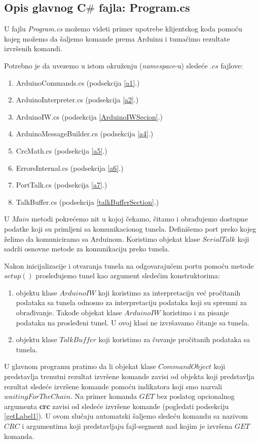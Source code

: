 \documentclass[a4paper]{extarticle}
\begin{document}
	\subsection{Opis glavnog C$\#$ fajla: Program.cs}
	\label{csharpglavnikod}
	
	U fajlu \textit{Program.cs} možemo videti primer upotrebe klijentskog koda pomoću kojeg možemo da šaljemo komande prema Arduinu i tumačimo rezultate izvršenih komandi.
	
	Potrebno je da uvezemo u istom okruženju (\textit{namespace}-u) sledeće $.cs$ fajlove:
	\begin{enumerate}
		\item ArduinoCommands.cs (podsekcija \ref{a1}.)
		\item ArduinoInterpreter.cs (podsekcija \ref{a2}.)
		\item ArduinoIW.cs (podsekcija \ref{ArduinoIWSecion}.)
		\item ArduinoMessageBuilder.cs (podsekcija \ref{a4}.)
		\item CrcMath.cs (podsekcija \ref{a5}.)
		\item ErrorsInternal.cs (podsekcija \ref{a6}.)
		\item PortTalk.cs (podsekcija \ref{a7}.)
		\item TalkBuffer.cs (podsekcija \ref{talkBufferSection}.)
	\end{enumerate}
	
	U $Main$ metodi pokrećemo nit u kojoj čekamo, čitamo i obrađujemo dostupne podatke koji su primljeni sa komunikacionog tunela. 
	Definišemo port preko kojeg  želimo da komuniciramo sa Arduinom. Koristimo objekat klase $SerialTalk$ koji sadrži osnovne metode za komunikaciju preko tunela.
	
	Nakon inicijalizacije i otvaranja tunela na odgovarajućem portu pomoću metode $setup()$ prosleđujemo tunel kao argument sledećim konstruktorima:
	\begin{enumerate}
		\item objektu klase $ArduinoIW$ koji koristimo za interpretaciju već pročitanih podataka sa tunela odnosno za interpretaciju podataka koji su spremni za obrađivanje. Takođe objekat klase $ArduinoIW$ koristimo i za pisanje podataka na prosleđeni tunel. U ovoj klasi ne izvršavamo čitanje sa tunela. 
		\item objektu klase $TalkBuffer$ koji koristimo za čuvanje pročitanih podataka sa tunela.
	\end{enumerate}  

	U glavnom programu pratimo da li objekat klase $CommandObject$ koji predstavlja trenutni rezultat izvršene komande zavisi od objekta koji predstavlja rezultat sledeće izvršene komande pomoću indikatora koji smo nazvali $waitingForTheChain$. Na primer komanda ${GET}$ bez poslatog opcionalnog argumenta \textbf{crc} zavisi od sledeće izvršene komande (pogledati podsekciju \ref{getLabel1}). U ovom slučaju automatski šaljemo sledeću komandu sa nazivom ${CRC}$ i argumentima koji predstavljaju fajl-segment nad kojim je izvršena ${GET}$ komanda.
	
\end{document}
